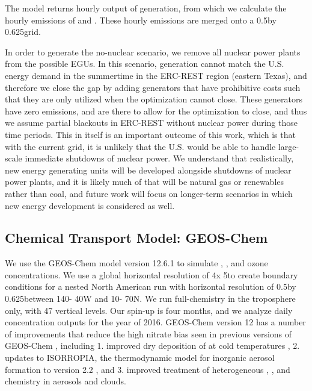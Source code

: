 \documentclass[12]{article}
\begin{document}
The model returns hourly output of generation, from which we calculate the hourly emissions of  and . These hourly emissions are merged onto a 0.5\degree by 0.625\degree grid. 

In order to generate the no-nuclear scenario, we remove all nuclear power plants from the possible EGUs. In this scenario, generation cannot match the U.S. energy demand in the summertime in the ERC-REST region (eastern Texas), and therefore we close the gap by adding generators that have prohibitive costs such that they are only utilized when the optimization cannot close. These generators have zero emissions, and are there to allow for the optimization to close, and thus we assume partial blackouts in ERC-REST  without nuclear power during those time periods. This in itself is an important outcome of this work, which is that with the current grid, it is unlikely that the U.S. would be able to handle large-scale immediate shutdowns of nuclear power. We understand that realistically, new energy generating units will be developed alongside shutdowns of nuclear power plants, and it is likely much of that will be natural gas or renewables rather than coal, and future work will focus on longer-term scenarios in which new energy development is considered as well.

\subsection{Chemical Transport Model: GEOS-Chem}
We use the GEOS-Chem model \citep{} version 12.6.1 \citep{noauthor_geos-chem_2019} to simulate , ,  and ozone concentrations. We use a global horizontal resolution of 4\degree x 5\degree to create boundary conditions for a nested North American run with horizontal resolution of 0.5\degree by 0.625\degree between 140\degree - 40\degree W and 10\degree - 70\degree N. We run full-chemistry in the troposphere only, with 47 vertical levels. Our spin-up is four months, and we analyze daily concentration outputs for the year of 2016. GEOS-Chem version 12 has a number of improvements that reduce the high nitrate bias seen in previous versions of GEOS-Chem \citep{walker_simulation_2012}, including 1. improved dry deposition of  at cold temperatures \citep{jaegle_nitrogen_2018}, 2. updates to ISORROPIA, the thermodynamic model for inorganic aerosol formation to version 2.2 \citep{fountoukis_isorropia_2007}, and 3. improved treatment of heterogeneous , , and  chemistry in aerosols and clouds.
\end{document}
